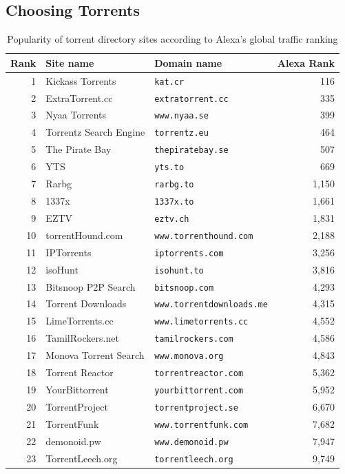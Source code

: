 \documentclass[10pt, a4paper, twoside]{scrartcl}
\renewcommand{\_}{\origunderscore\allowbreak}
\begin{document}
\subsection{Choosing Torrents}
\begin{table}
\centering
\begin{tabular}{rllr}
\toprule
Rank & Site name & Domain name & Alexa Rank \\
\midrule
1 & Kickass Torrents & \texttt{kat.cr} & 116 \\
2 & ExtraTorrent.cc & \texttt{extratorrent.cc} & 335 \\
3 & Nyaa Torrents & \texttt{www.nyaa.se} & 399 \\
4 & Torrentz Search Engine & \texttt{torrentz.eu} & 464 \\
5 & The Pirate Bay & \texttt{thepiratebay.se} & 507 \\
6 & YTS & \texttt{yts.to} & 669 \\
7 & Rarbg & \texttt{rarbg.to} & 1,150 \\
8 & 1337x & \texttt{1337x.to} & 1,661 \\
9 & EZTV & \texttt{eztv.ch} & 1,831 \\
10 & torrentHound.com & \texttt{www.torrenthound.com} & 2,188 \\
11 & IPTorrents & \texttt{iptorrents.com} & 3,256 \\
12 & isoHunt & \texttt{isohunt.to} & 3,816 \\
13 & Bitsnoop P2P Search & \texttt{bitsnoop.com} & 4,293 \\
14 & Torrent Downloads & \texttt{www.torrentdownloads.me} & 4,315 \\
15 & LimeTorrents.cc & \texttt{www.limetorrents.cc} & 4,552 \\
16 & TamilRockers.net & \texttt{tamilrockers.com} & 4,586 \\
17 & Monova Torrent Search & \texttt{www.monova.org} & 4,843 \\
18 & Torrent Reactor & \texttt{torrentreactor.com} & 5,362 \\
19 & YourBittorrent & \texttt{yourbittorrent.com} & 5,952 \\
20 & TorrentProject & \texttt{torrentproject.se} & 6,670 \\
21 & TorrentFunk & \texttt{www.torrentfunk.com} & 7,682 \\
22 & demonoid.pw & \texttt{www.demonoid.pw} & 7,947 \\
23 & TorrentLeech.org & \texttt{torrentleech.org} & 9,749 \\
\bottomrule
\end{tabular}
\caption{Popularity of torrent directory sites according to Alexa's global traffic ranking}
\label{torrentsites}
\end{table}
\end{document}
